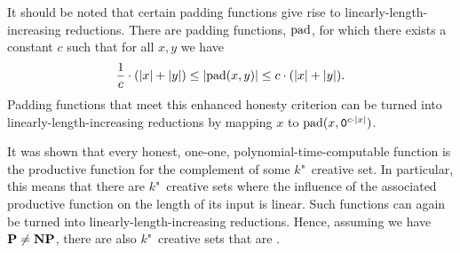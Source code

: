 It should be noted that certain padding functions give rise to linearly-length-increasing reductions.
There are padding functions, $\operatorname{pad}$, for which there exists a constant $c$ such that for all $x, y$ we have
\begin{equation*}
  \frac{1}{c} \cdot ({\lvert x\rvert} + {\lvert y\rvert}) \le {\lvert\operatorname{pad}(x, y)\rvert} \le c \cdot ({\lvert x\rvert} + {\lvert y\rvert}).
\end{equation*}
Padding functions that meet this enhanced honesty criterion can be turned into linearly-length-increasing reductions by mapping $x$ to $\operatorname{pad}(x, \textnormal{\texttt{0}}^{c \cdot {\lvert x\rvert}})$.

It was shown \parencite{young1983some} that every honest, one-one, polynomial-time-computable function is the productive function for the complement of some $k$"~creative set.
In particular, this means that there are $k$"~creative sets where the influence of the associated productive function on the length of its input is linear.
Such functions can again be turned into linearly-length-increasing reductions.
Hence, assuming we have $\textnormal{\textbf{P}} \neq \textnormal{\textbf{NP}}$, there are also $k$"~creative sets that are .

